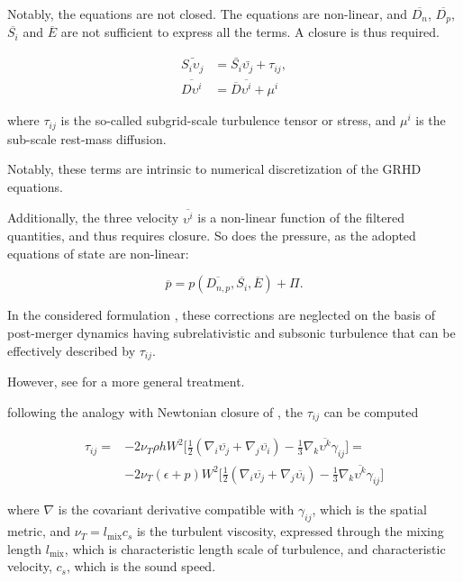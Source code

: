 \documentclass[11pt,a4paper,headinclude=true,DIV=14,BCOR=8mm,chapterprefix,listof=totoc,twoside,openright,abstracton]{scrbook}
\begin{document}
Notably, the equations are not closed. 
The equations are non-linear, and $\overline{D_{n}}$, $\overline{D_p}$, $\overline{S_i}$ and $\overline{E}$ are not sufficient to express all the terms.
A closure is thus required.

\begin{eqnarray}
    \bar{S_i\upsilon_j} &= \bar{S_i}\bar{\upsilon_j} + \tau_{ij}, \\
    \overline{D\upsilon^i} &= \overline{D}\overline{\upsilon^i} + \mu^i
\end{eqnarray}

where $\tau_{ij}$ is the so-called subgrid-scale turbulence tensor \cite{Radice:2017zta} or stress,
and $\mu^i$ is the sub-scale rest-mass diffusion.

Notably, these terms are intrinsic to numerical discretization of the GRHD equations. 

Additionally, the three velocity $\overline{\upsilon^i}$ is a non-linear function of the filtered quantities, and thus requires closure. So does the pressure, as the adopted equations of state are non-linear:

\begin{equation}
    \overline{p} = p(\overline{D_{n,p}},\overline{S_i},\overline{E}) + \Pi.
\end{equation}

In the considered formulation \cite{Radice:2020ids}, these corrections are neglected on the basis of post-merger dynamics having subrelativistic and subsonic turbulence that can be effectively described by $\tau_{ij}$.

However, see \cite{Carrasco:2019uzl,Vigano:2020ouc} for a more general treatment.

following the analogy with Newtonian closure of \cite{Smagorinsky:1963}, the $\tau_{ij}$ can be computed \cite{Radice:2017zta}
 
\begin{align}
    \tau_{ij} = &-2\nu_T\rho h W^2\Big[ \frac{1}{2}(\nabla_i\overline{\upsilon_j} + \nabla_j\overline{\upsilon_i}) - \frac{1}{3}\nabla_k\overline{\upsilon^k}\gamma_{ij} \Big] = \\
    &-2 \nu_T (\epsilon + p)W^2\Big[ \frac{1}{2} (\nabla_i\overline{\upsilon_j} + \nabla_j\overline{\upsilon_i}) - \frac{1}{3}\nabla_k\overline{\upsilon^k}\gamma_{ij} \Big]
\end{align}

where $\nabla$ is the covariant derivative compatible with $\gamma_{ij}$, which is the spatial metric, and $\nu_T = l_{\text{mix}}c_s$ is the turbulent viscosity, expressed through the mixing length $l_{\text{mix}}$, which is characteristic length scale of turbulence, and characteristic velocity, $c_s$, which is the sound speed.
\end{document}
